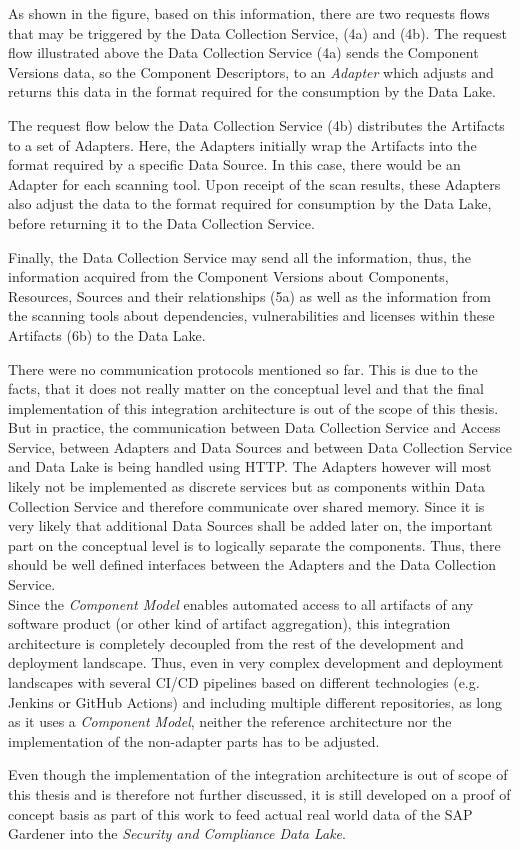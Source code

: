 As shown in the figure, based on this information, there are two requests flows that may be triggered by the Data Collection Service, (4a) and (4b). The request flow illustrated above the Data Collection Service (4a) sends the Component Versions data, so the Component Descriptors, to an \emph{Adapter} which adjusts and returns this data in the format required for the consumption by the Data Lake.\par 
The request flow below the Data Collection Service (4b) distributes the Artifacts to a set of Adapters. Here, the Adapters initially wrap the Artifacts into the format required by a specific Data Source. In this case, there would be an Adapter for each scanning tool. Upon receipt of the scan results, these Adapters also adjust the data to the format required for consumption by the Data Lake, before returning it to the Data Collection Service.\par 
Finally, the Data Collection Service may send all the information, thus, the information acquired from the Component Versions about Components, Resources, Sources and their relationships (5a) as well as the information from the scanning tools about dependencies, vulnerabilities and licenses within these Artifacts (6b) to the Data Lake.\par
There were no communication protocols mentioned so far. This is due to the facts, that it does not really matter on the conceptual level and that the final implementation of this integration architecture is out of the scope of this thesis. But in practice, the communication between Data Collection Service and Access Service, between Adapters and Data Sources and between Data Collection Service and Data Lake is being handled using HTTP. The Adapters however will most likely not be implemented as discrete services but as components within Data Collection Service and therefore communicate over shared memory. Since it is very likely that additional Data Sources shall be added later on, the important part on the conceptual level is to logically separate the components. Thus, there should be well defined interfaces between the Adapters and the Data Collection Service.\\

Since the \emph{Component Model} enables automated access to all artifacts of any software product (or other kind of artifact aggregation), this integration architecture is completely decoupled from the rest of the development and deployment landscape. Thus, even in very complex development and deployment landscapes with several CI/CD pipelines based on different technologies (e.g. Jenkins or GitHub Actions) and including multiple different repositories, as long as it uses a \emph{Component Model}, neither the reference architecture nor the implementation of the non-adapter parts has to be adjusted.\par
Even though the implementation of the integration architecture is out of scope of this thesis and is therefore not further discussed, it is still developed on a proof of concept basis as part of this work to feed actual real world data of the SAP Gardener into the \emph{Security and Compliance Data Lake}.

